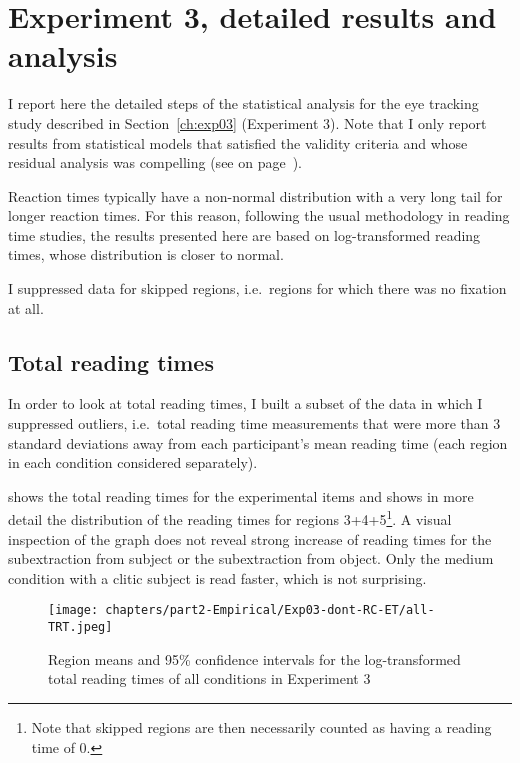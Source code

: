 \chapter{Experiment 3, detailed results and analysis}
\label{ch:exp03-appendix}

I report here the detailed steps of the statistical analysis for the eye tracking study described in Section~\ref{ch:exp03} (Experiment 3). 
Note that I only report results from statistical models that satisfied the validity criteria and whose residual analysis was compelling (see on page~\pageref{ch:linear-models}).

Reaction times typically have a non-normal distribution with a very long tail for longer reaction times. For this reason, following the usual methodology in reading time studies, the results presented here are based on log-transformed reading times, whose distribution is closer to normal. 

I suppressed data for skipped regions, i.e.\ regions for which there was no fixation at all. 

\section{Total reading times}

In order to look at total reading times, I built a subset of the data in which I suppressed outliers, i.e.\ total reading time measurements that were more than 3 standard deviations away from each participant's mean reading time (each region in each condition considered separately). 

 shows the total reading times for the experimental items and  shows in more detail the distribution of the reading times for regions 3+4+5\footnote{Note that skipped regions are then necessarily counted as having a reading time of 0.}. A visual inspection of the graph does not reveal strong increase of reading times for the subextraction from subject or the subextraction from object. Only the medium condition with a clitic subject is read faster, which is not surprising. 

\begin{figure}
    \centering
    \texttt{[image: chapters/part2-Empirical/Exp03-dont-RC-ET/all-TRT.jpeg]}
    \caption{Region means and 95\% confidence intervals for the log-transformed total reading times of all conditions in Experiment 3}
    \label{fig:exp03-all-TRT}
\end{figure}

